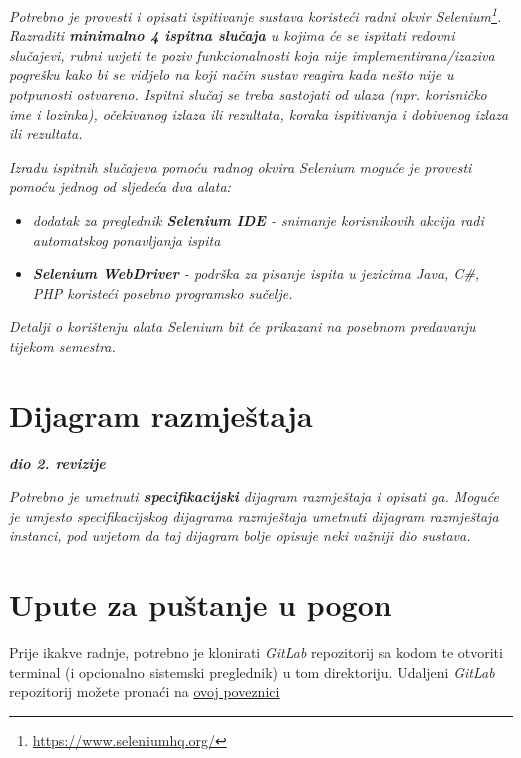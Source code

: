 			 \textit{Potrebno je provesti i opisati ispitivanje sustava koristeći radni okvir Selenium\footnote{\url{https://www.seleniumhq.org/}}. Razraditi \textbf{minimalno 4 ispitna slučaja} u kojima će se ispitati redovni slučajevi, rubni uvjeti te poziv funkcionalnosti koja nije implementirana/izaziva pogrešku kako bi se vidjelo na koji način sustav reagira kada nešto nije u potpunosti ostvareno. Ispitni slučaj se treba sastojati od ulaza (npr. korisničko ime i lozinka), očekivanog izlaza ili rezultata, koraka ispitivanja i dobivenog izlaza ili rezultata.\\ }
			 
			 \textit{Izradu ispitnih slučajeva pomoću radnog okvira Selenium moguće je provesti pomoću jednog od sljedeća dva alata:}
			 \begin{itemize}
			 	\item \textit{dodatak za preglednik \textbf{Selenium IDE} - snimanje korisnikovih akcija radi automatskog ponavljanja ispita	}
			 	\item \textit{\textbf{Selenium WebDriver} - podrška za pisanje ispita u jezicima Java, C\#, PHP koristeći posebno programsko sučelje.}
			 \end{itemize}
		 	\textit{Detalji o korištenju alata Selenium bit će prikazani na posebnom predavanju tijekom semestra.}
			
			\eject 
		
		
		\section{Dijagram razmještaja}
			
			\textbf{\textit{dio 2. revizije}}
			
			 \textit{Potrebno je umetnuti \textbf{specifikacijski} dijagram razmještaja i opisati ga. Moguće je umjesto specifikacijskog dijagrama razmještaja umetnuti dijagram razmještaja instanci, pod uvjetom da taj dijagram bolje opisuje neki važniji dio sustava.}
			
			\eject 
		
		\section{Upute za puštanje u pogon}
		
		    Prije ikakve radnje, potrebno je klonirati \textit{GitLab} repozitorij sa kodom te otvoriti terminal (i opcionalno sistemski preglednik) u tom direktoriju. Udaljeni \textit{GitLab} repozitorij možete pronaći na  \underline{\href{https://gitlab.com/Cubi5/seven}{ovoj poveznici}}
		    
